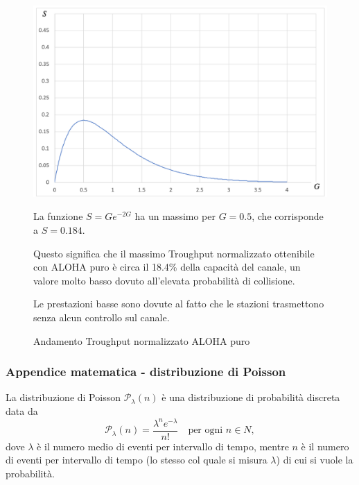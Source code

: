 \begin{figure}[htbp]
    \centering
    \begin{minipage}{0.5\textwidth}
        \includegraphics[width=\linewidth]{images/funzionealoha.png}
        \caption{Andamento Troughput normalizzato ALOHA puro}
        \label{fig:funzione-aloha}
    \end{minipage}%
    \hfill
    \begin{minipage}{0.45\textwidth}
        La funzione $S = G e^{-2G}$ ha un massimo per $G = 0.5$, che corrisponde a $S = 0.184$.
        
        Questo significa che il massimo Troughput normalizzato ottenibile con ALOHA puro è circa il 18.4\% della capacità del canale, un valore molto basso dovuto all'elevata probabilità di collisione.
        
        Le prestazioni basse sono dovute al fatto che le stazioni trasmettono senza alcun controllo sul canale.
    \end{minipage}
\end{figure}
\subsubsection{Appendice matematica - distribuzione di Poisson}
La distribuzione di Poisson $\mathcal{P}_\lambda(n)$ è una distribuzione di probabilità discreta data da
\begin{equation}
\mathcal{P}_\lambda(n) = \frac{\lambda^n e^{-\lambda}}{n!} \quad \text{per ogni } n \in {N},
\end{equation}
dove $\lambda$ è il numero medio di eventi per intervallo di tempo, mentre $n$ è il numero di eventi per intervallo di tempo (lo stesso col quale si misura $\lambda$) di cui si vuole la probabilità.

